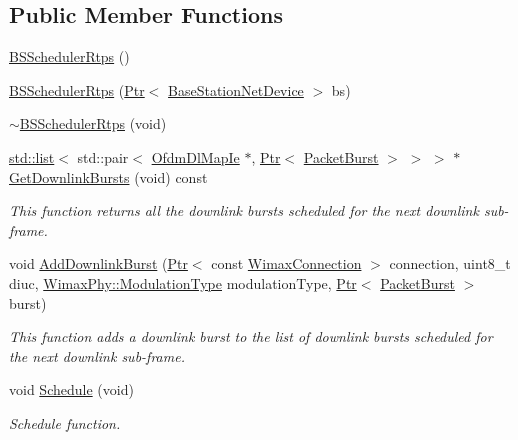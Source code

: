 \subsection*{Public Member Functions}
\begin{DoxyCompactItemize}
\item 
\hyperlink{classns3_1_1BSSchedulerRtps_acf23bbe9a781385523b2349c676c1f7e}{B\+S\+Scheduler\+Rtps} ()
\item 
\hyperlink{classns3_1_1BSSchedulerRtps_a78b27370d8624a84be9d1bb037b80036}{B\+S\+Scheduler\+Rtps} (\hyperlink{classns3_1_1Ptr}{Ptr}$<$ \hyperlink{classns3_1_1BaseStationNetDevice}{Base\+Station\+Net\+Device} $>$ bs)
\item 
\hyperlink{classns3_1_1BSSchedulerRtps_a948fd5099730f9b677ebd4fd0642927c}{$\sim$\+B\+S\+Scheduler\+Rtps} (void)
\item 
\hyperlink{openflow-interface_8h_afd9bcfa176617760671b67580f536fa7}{std\+::list}$<$ std\+::pair$<$ \hyperlink{classns3_1_1OfdmDlMapIe}{Ofdm\+Dl\+Map\+Ie} $\ast$, \hyperlink{classns3_1_1Ptr}{Ptr}$<$ \hyperlink{classns3_1_1PacketBurst}{Packet\+Burst} $>$ $>$ $>$ $\ast$ \hyperlink{classns3_1_1BSSchedulerRtps_a9c228dcf18263a21911a05d2fb147db0}{Get\+Downlink\+Bursts} (void) const 
\begin{DoxyCompactList}\small\item\em This function returns all the downlink bursts scheduled for the next downlink sub-\/frame. \end{DoxyCompactList}\item 
void \hyperlink{classns3_1_1BSSchedulerRtps_ab58c3772737a8fcd20ec05680253b087}{Add\+Downlink\+Burst} (\hyperlink{classns3_1_1Ptr}{Ptr}$<$ const \hyperlink{classns3_1_1WimaxConnection}{Wimax\+Connection} $>$ connection, uint8\+\_\+t diuc, \hyperlink{classns3_1_1WimaxPhy_a044c5d8a48ca992c39c2a946f6e755fa}{Wimax\+Phy\+::\+Modulation\+Type} modulation\+Type, \hyperlink{classns3_1_1Ptr}{Ptr}$<$ \hyperlink{classns3_1_1PacketBurst}{Packet\+Burst} $>$ burst)
\begin{DoxyCompactList}\small\item\em This function adds a downlink burst to the list of downlink bursts scheduled for the next downlink sub-\/frame. \end{DoxyCompactList}\item 
void \hyperlink{classns3_1_1BSSchedulerRtps_a311c9c524b1a898c72afa35a9d7ac0dc}{Schedule} (void)
\begin{DoxyCompactList}\small\item\em Schedule function. \end{DoxyCompactList}\item 

\end{DoxyCompactItemize}
